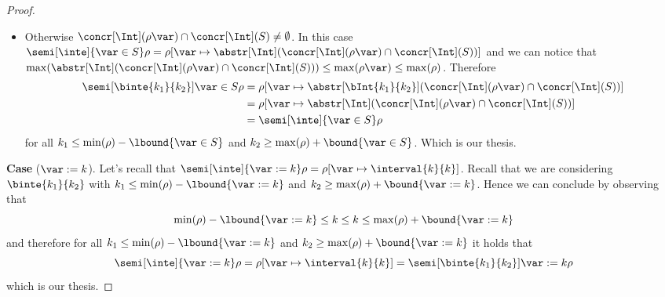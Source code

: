 \begin{proof}
\begin{itemize}
  \item Otherwise
    \({\concr[\Int](\rho\var) \cap \concr[\Int](S) \neq
      \emptyset}\). In this case
    \({\semi[\inte]{\var \in S}\rho = \rho[\var \mapsto
      \abstr[\Int](\concr[\Int](\rho\var) \cap \concr[\Int](S))]}\)
    and we can notice that
    \(\max(\abstr[\Int](\concr[\Int](\rho\var) \cap \concr[\Int](S)))
    \leq \max(\rho\var) \leq \max(\rho)\). Therefore
    \begin{align*}
      \semi[\binte{k_1}{k_2}]{\var \in S}\rho & = \rho[\var \mapsto \abstr[\bInt{k_1}{k_2}](\concr[\Int](\rho\var) \cap \concr[\Int](S))] \\
                                              & = \rho[\var \mapsto \abstr[\Int](\concr[\Int](\rho\var) \cap \concr[\Int](S))] \\
                                              & = \semi[\inte]{\var\in S}\rho
    \end{align*}
    for all \(k_1 \leq \min(\rho) - \lbound{\var \in S}\) and
    \(k_2 \geq \max(\rho) + \bound{\var\in S}\). Which is our thesis.
  \end{itemize}

  \medskip
  
  \noindent
  \textbf{Case} (\(\var := k\)).
  Let's recall that
  \({\semi[\inte]{\var := k}\rho = \rho[\var \mapsto \interval{k}{k}
    ]}\). Recall that we are considering \(\binte{k_1}{k_2}\) with
  \(k_1 \leq \min(\rho) - \lbound{\var := k}\) and
  \(k_2 \geq \max(\rho) + \bound{\var := k}\). Hence we can conclude by
  observing that
  \begin{equation*}
    \min(\rho) - \lbound{\var := k} \leq k \leq k \leq \max(\rho) + \bound{\var := k}
  \end{equation*}
  and therefore for all \(k_1 \leq \min(\rho) - \lbound{\var:=k}\) and
  \(k_2 \geq \max(\rho) + \bound{\var := k}\) it holds that
  \begin{equation*}
    \semi[\inte]{\var := k}\rho = \rho[\var \mapsto \interval{k}{k}] = \semi[\binte{k_1}{k_2}]{\var := k}\rho
  \end{equation*}
  which is our thesis.

  \medskip
  

\end{proof}
